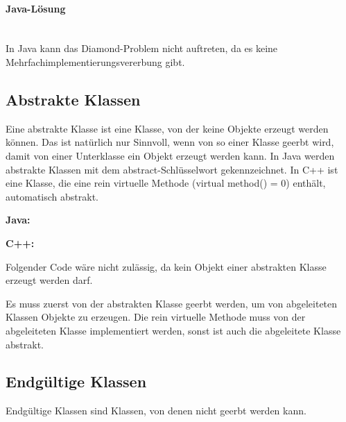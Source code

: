 			\paragraph{Java-Lösung}\mbox{}\\
				In Java kann das Diamond-Problem nicht auftreten, da es keine Mehrfachimplementierungsvererbung gibt.
			
	\subsection{Abstrakte Klassen}
		Eine abstrakte Klasse ist eine Klasse, von der keine Objekte erzeugt werden können. Das ist natürlich nur Sinnvoll,
		wenn von so einer Klasse geerbt wird, damit von einer Unterklasse ein Objekt erzeugt werden kann. In Java werden
		abstrakte Klassen mit dem abstract-Schlüsselwort gekennzeichnet. In C++ ist eine Klasse, die eine rein virtuelle
		Methode (virtual method() = 0) enthält, automatisch abstrakt.
		
		{\bfseries Java:}
			\UseRawInputEncoding{}
		
		{\bfseries C++:}
			\UseRawInputEncoding{}
			
			Folgender Code wäre nicht zulässig, da kein Objekt einer abstrakten Klasse erzeugt werden darf.
			\UseRawInputEncoding{}
			
			Es muss zuerst von der abstrakten Klasse geerbt werden, um von abgeleiteten Klassen Objekte zu erzeugen. Die rein
			virtuelle Methode muss von der abgeleiteten Klasse implementiert werden, sonst ist auch die abgeleitete Klasse
			abstrakt.
			\UseRawInputEncoding{}
	
	\subsection{Endgültige Klassen}
		Endgültige Klassen sind Klassen, von denen nicht geerbt werden kann.
		\UseRawInputEncoding{}
